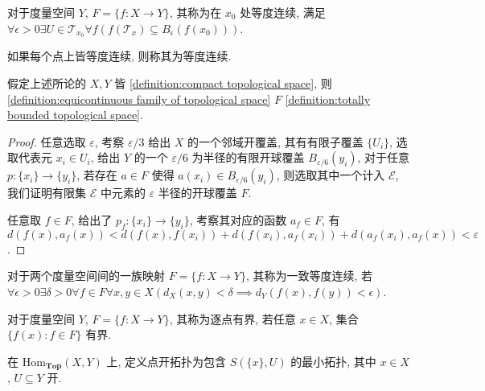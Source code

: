 \begin{definition}[等度连续]
    \label {definition:equicontinuous family of topological space}
    对于度量空间 \(Y\), \(F = \{f : X \to Y\}\), 其称为在 \(x_0\) 处等度连续, 满足 \(\forall \epsilon > 0 \exists U \in \mathcal{T}_{x_0} \forall f (f(\mathcal{T}_x) \subseteq B_\epsilon (f(x_0)))\).

    如果每个点上皆等度连续, 则称其为等度连续.
\end{definition}

\begin{lemma}
    假定上述所论的 \(X,Y\) 皆 \ref{definition:compact topological space}, 则 \ref{definition:equicontinuous family of topological space} \(F\) \ref{definition:totally bounded topological space}.

    \begin{proof}
        任意选取 \(\varepsilon\), 考察 \(\varepsilon/3\) 给出 \(X\) 的一个邻域开覆盖, 其有有限子覆盖 \(\{U_i\}\),
        选取代表元 \(x_i \in U_i\), 给出 \(Y\) 的一个 \(\varepsilon/6\) 为半径的有限开球覆盖 \(B_{\varepsilon/6} (y_i)\),
        对于任意 \(p : \{x_i\} \to \{y_i\}\), 若存在 \(a \in F\) 使得 \(a(x_i) \in B_{\varepsilon/6} (y_i)\), 则选取其中一个计入 \(\mathcal{E}\),
        我们证明有限集 \(\mathcal{E}\) 中元素的 \(\varepsilon\) 半径的开球覆盖 \(F\).

        任意取 \(f \in F\), 给出了 \(p_f : \{x_i\} \to \{y_i\}\), 考察其对应的函数 \(a_f \in F\), 有 \(d (f(x),a_f(x)) < d (f(x),f(x_i)) + d (f(x_i),a_f(x_i)) + d (a_f(x_i),a_f(x)) < \varepsilon\).
    \end{proof}
\end{lemma}

\begin{definition}
    对于两个度量空间间的一族映射 \(F = \{f : X \to Y\}\), 其称为一致等度连续, 若 \(\forall \epsilon > 0 \exists \delta > 0 \forall f \in F \forall x,y \in X (d_X (x,y) < \delta \implies d_Y (f(x),f(y)) < \epsilon)\).
\end{definition}

\begin{definition}
    对于度量空间 \(Y\), \(F = \{f : X \to Y\}\), 其称为逐点有界, 若任意 \(x \in X\), 集合 \(\{f(x) : f \in F\}\) 有界.
\end{definition}

\begin{definition}[点开拓扑]
    在 \(\mathrm{Hom}_{\mathbf{Top}} (X,Y)\) 上, 定义点开拓扑为包含 \(S(\{x\},U)\) 的最小拓扑, 其中 \(x \in X\), \(U \subseteq Y\) 开.
\end{definition}

